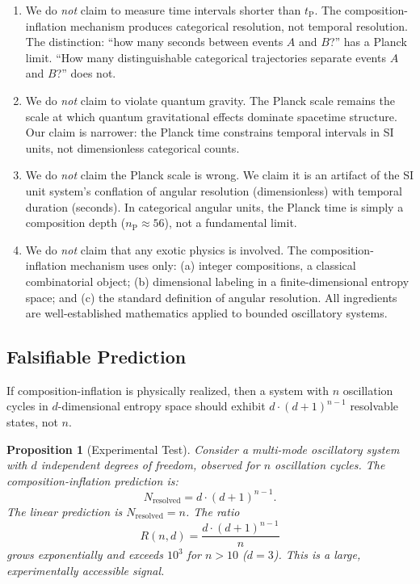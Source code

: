 \documentclass[twocolumn,10pt,a4paper]{article}
\newtheorem{proposition}[theorem]{Proposition}
\theoremstyle{definition}
\theoremstyle{remark}
\newcommand{\tP}{t_{\mathrm{P}}}
\newcommand{\nP}{n_{\mathrm{P}}}
\begin{document}
\begin{enumerate}[label=(\roman*)]
\item We do \emph{not} claim to measure time intervals shorter than $\tP$. The composition-inflation mechanism produces categorical resolution, not temporal resolution. The distinction: ``how many seconds between events $A$ and $B$?'' has a Planck limit. ``How many distinguishable categorical trajectories separate events $A$ and $B$?'' does not.

\item We do \emph{not} claim to violate quantum gravity. The Planck scale remains the scale at which quantum gravitational effects dominate spacetime structure. Our claim is narrower: the Planck time constrains temporal intervals in SI units, not dimensionless categorical counts.

\item We do \emph{not} claim the Planck scale is wrong. We claim it is an artifact of the SI unit system's conflation of angular resolution (dimensionless) with temporal duration (seconds). In categorical angular units, the Planck time is simply a composition depth ($\nP \approx 56$), not a fundamental limit.

\item We do \emph{not} claim that any exotic physics is involved. The composition-inflation mechanism uses only: (a) integer compositions, a classical combinatorial object; (b) dimensional labeling in a finite-dimensional entropy space; and (c) the standard definition of angular resolution. All ingredients are well-established mathematics applied to bounded oscillatory systems.
\end{enumerate}

\subsection{Falsifiable Prediction}

If composition-inflation is physically realized, then a system with $n$ oscillation cycles in $d$-dimensional entropy space should exhibit $d \cdot (d+1)^{n-1}$ resolvable states, not $n$.

\begin{proposition}[Experimental Test]
\label{prop:test}
Consider a multi-mode oscillatory system with $d$ independent degrees of freedom, observed for $n$ oscillation cycles. The composition-inflation prediction is:
\begin{equation}
N_{\mathrm{resolved}} = d \cdot (d+1)^{n-1}.
\end{equation}
The linear prediction is $N_{\mathrm{resolved}} = n$. The ratio
\begin{equation}
R(n,d) = \frac{d \cdot (d+1)^{n-1}}{n}
\end{equation}
grows exponentially and exceeds $10^3$ for $n > 10$ ($d = 3$). This is a large, experimentally accessible signal.
\end{proposition}
\end{document}
